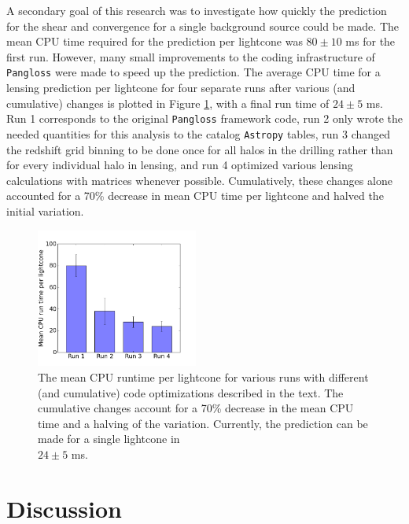 \documentclass[%
 reprint,
 amsmath,amssymb,
 aps,nofootinbib
]{revtex4-1}
\begin{document}
A secondary goal of this research was to investigate how quickly the prediction for the shear and convergence for a single background source could be made. The mean CPU time required for the prediction per lightcone was ${80\pm10}$ ms for the first run. However, many small improvements to the coding infrastructure of \texttt{Pangloss} were made to speed up the prediction. The average CPU time for a lensing prediction per lightcone for four separate runs after various (and cumulative) changes is plotted in Figure \ref{cpu_plot}, with a final run time of $24\pm5$ ms. Run 1 corresponds to the original \texttt{Pangloss} framework code, run 2 only wrote the needed quantities for this analysis to the catalog \texttt{Astropy} tables, run 3 changed the redshift grid binning to be done once for all halos in the drilling rather than for every individual halo in lensing, and run 4 optimized various lensing calculations with matrices whenever possible. Cumulatively, these changes alone accounted for a 70\% decrease in mean CPU time per lightcone and halved the initial variation.

\begin{figure}
    \centering
    \includegraphics[width=0.475\textwidth]{figs-swe/profile_bar.png}
    \captionsetup{justification=raggedright,singlelinecheck=false}
    \caption{The mean CPU runtime per lightcone for various runs with different (and cumulative) code optimizations described in the text. The cumulative changes account for a 70\% decrease in the mean CPU time and a halving of the variation. Currently, the prediction can be made for a single lightcone in\\$24\pm5$ ms.}
    \label{cpu_plot}
\end{figure}

\section{Discussion}
\end{document}
